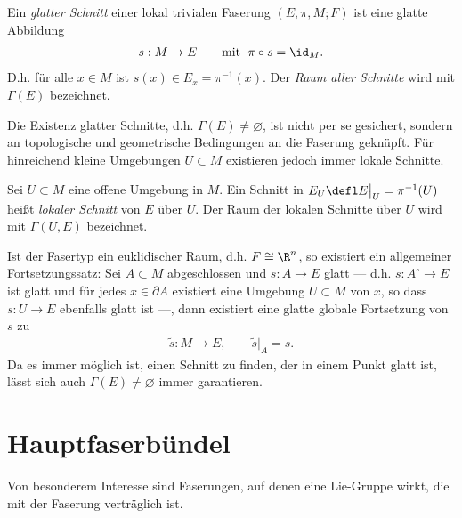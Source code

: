 \documentclass[%
	paper=a5,%
	fleqn,%
	DIV=18,%
	BCOR=0mm,
	fontsize=11pt,
	titlepage=false,%
	bibliography=totoc,
	DIV=18,%
	twoside=true,
	pdftitle=Riemannsche Geometrie,
	pdfauthor=Uwe Semmelmann,
	numbers=noendperiod]%
	{scrbook}
\begin{document}
\begin{defn}
Ein \emph{glatter Schnitt} einer lokal trivialen Faserung $(E,\pi,M;F)$ ist eine
glatte Abbildung
\begin{align*}
s: M\to E    \qquad \text{mit }   \;  \pi\circ s = \id_M.
\end{align*}
D.h. für alle $x\in M$ ist $s(x)\in E_x = \pi^{-1}(x)$. Der \emph{Raum aller
Schnitte} wird mit $\Gamma(E)$ bezeichnet.
\fish
\end{defn}

Die Existenz glatter Schnitte, d.h. $\Gamma(E)\neq \varnothing$, ist nicht per
se gesichert, sondern an topologische und geometrische Bedingungen an die
Faserung geknüpft. Für hinreichend kleine Umgebungen $U\subset M$ existieren
jedoch immer lokale Schnitte.

\begin{defn}
Sei $U\subset M$ eine offene Umgebung in $M$. Ein Schnitt in $E_U \defl
E\big|_U= \pi^{-1}(U)$ heißt \emph{lokaler Schnitt} von
$E$ über $U$. Der Raum der lokalen Schnitte über $U$ wird mit $\Gamma(U,E)$
bezeichnet.\fish
\end{defn}

\begin{rem}
Ist der Fasertyp ein euklidischer Raum, d.h. $F\cong \R^n$, so existiert ein
allgemeiner Fortsetzungssatz: Sei $A\subset M$ abgeschlossen und $s: A\to E$
glatt --- d.h. $s: A^\circ \to E$ ist glatt und für jedes $x\in\partial A$
existiert eine Umgebung $U\subset M$ von $x$, so dass $s: U\to E$ ebenfalls
glatt ist ---, dann existiert eine glatte globale Fortsetzung von $s$ zu
\begin{align*}
\tilde{s}: M\to E,\qquad \tilde{s}\big|_A = s.
\end{align*}
Da es immer möglich ist, einen Schnitt zu finden, der in einem Punkt glatt ist, lässt
sich auch $\Gamma(E)\neq\varnothing$ immer garantieren.\map
\end{rem}

\section{Hauptfaserbündel}

Von besonderem Interesse sind Faserungen, auf denen eine Lie-Gruppe wirkt,
die mit der Faserung verträglich ist.
\end{document}
